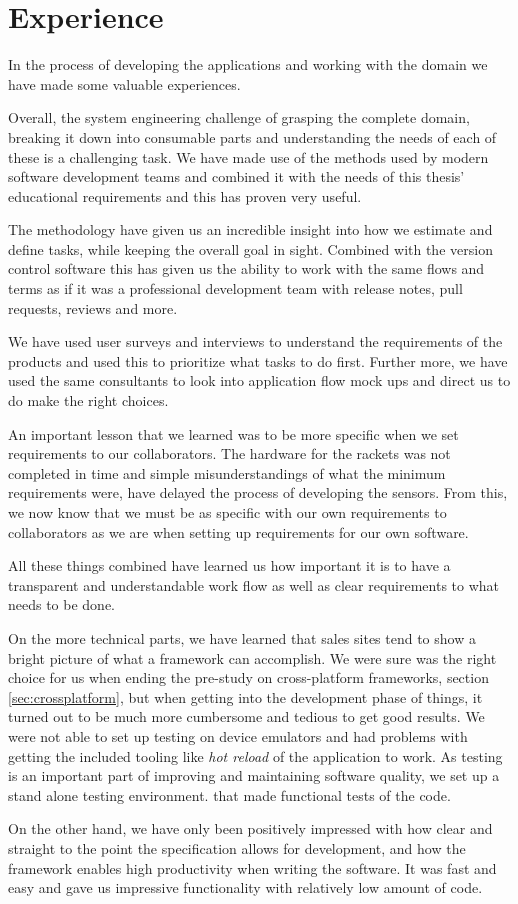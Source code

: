 \chapter{Experience}
In the process of developing the applications and working with the domain we have made some valuable experiences.

Overall, the system engineering challenge of grasping the complete domain, breaking it down into consumable parts and understanding the needs of each of these is a challenging task.
We have made use of the methods used by modern software development teams and combined it with the needs of this thesis' educational requirements and this has proven very useful.

The  methodology have given us an incredible insight into how we estimate and define tasks, while keeping the overall goal in sight.
Combined with the version control software this has given us the ability to work with the same flows and terms as if it was a professional development team with release notes, pull requests, reviews and more.

We have used user surveys and interviews to understand the requirements of the products and used this to prioritize what tasks to do first.
Further more, we have used the same consultants to look into application flow mock ups and direct us to do make the right choices.

An important lesson that we learned was to be more specific when we set requirements to our collaborators.
The hardware for the rackets was not completed in time and simple misunderstandings of what the minimum requirements were, have delayed the process of developing the sensors.
From this, we now know that we must be as specific with our own requirements to collaborators as we are when setting up requirements for our own software.

All these things combined have learned us how important it is to have a transparent and understandable work flow as well as clear requirements to what needs to be done.

On the more technical parts, we have learned that sales sites tend to show a bright picture of what a framework can accomplish.
We were sure  was the right choice for us when ending the pre-study on cross-platform frameworks, section \ref{sec:crossplatform}, but when getting into the development phase of things, it turned out to be much more cumbersome and tedious to get good results.
We were not able to set up testing on device emulators and had problems with getting the included tooling like \textit{hot reload} of the application to work.
As testing is an important part of improving and maintaining software quality, we set up a stand alone testing environment. that made functional tests of the code.

On the other hand, we have only been positively impressed with how clear and straight to the point the  specification allows for development, and how the  framework enables high productivity when writing the software.
It was fast and easy and gave us impressive functionality with relatively low amount of code.
